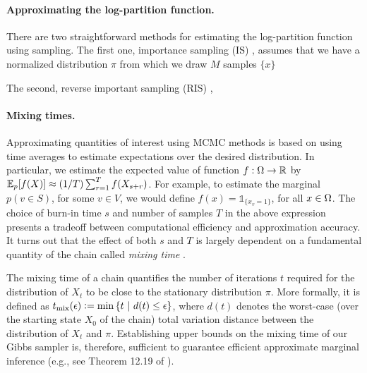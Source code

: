 \paragraph{Approximating the log-partition function.}
There are two straightforward methods for estimating the log-partition function using sampling.
The first one, importance sampling (IS) \citep{ais}, assumes that we have a normalized distribution $\pi$ from which we draw $M$ samples $\{x\}$

The second, reverse important sampling (RIS) \citep{ris},

\paragraph{Mixing times.}
Approximating quantities of interest using MCMC methods is based on using time averages to estimate expectations over the desired distribution.
In particular, we estimate the expected value of function $f : \ss \to \mathbb{R}$ by $\E_p[f(X)] \approx (1/T)\sum_{r=1}^{T} f(X_{s + r})$.
For example, to estimate the marginal $p(v \in S)$, for some $v \in V$, we would define $f(x) = \mathds{1}_{\{x_v = 1\}}$, for all $x \in \ss$.
The choice of burn-in time $s$ and number of samples $T$ in the above expression presents a tradeoff between computational efficiency and approximation accuracy.
It turns out that the effect of both $s$ and $T$ is largely dependent on a fundamental quantity of the chain called \emph{mixing time} \cite{levin08}.

The mixing time of a chain quantifies the number of iterations $t$ required for the distribution of $X_t$ to be close to the stationary distribution $\pi$.
More formally, it is defined as $\tme \defeq \min \sdef{t}{d(t) \leq \epsilon}$, where $d(t)$ denotes the worst-case (over the starting state $X_0$ of the chain) total variation distance between the distribution of $X_t$ and $\pi$.
Establishing upper bounds on the mixing time of our Gibbs sampler is, therefore, sufficient to guarantee efficient approximate marginal inference (e.g., see Theorem 12.19 of \citet{levin08}).